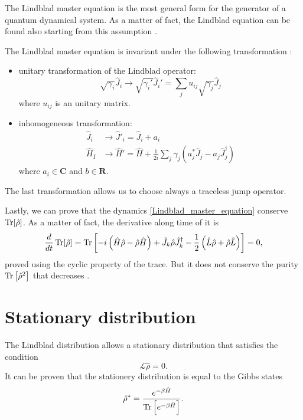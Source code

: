 The Lindblad master equation is the most general form for the generator of a quantum dynamical system. As a matter of fact, the Lindblad equation can be found also starting from this assumption \cite{Breuer-Petruccione}.

The Lindblad master equation is invariant under the following transformation \cite{Breuer-Petruccione}:
\begin{itemize}
    \item unitary transformation of the Lindblad operator:
        \begin{equation}
            \sqrt{\gamma_i}\hat J_i \rightarrow \sqrt{\gamma_i'}\hat J_i' = \sum_j u_{ij}\sqrt{\gamma_j}\hat J_j
        \end{equation}
        where $u_{ij}$ is an unitary matrix.
    \item inhomogeneous transformation:
        \begin{equation}
            \begin{split}
                \hat J_i &\rightarrow \hat J'_i = \hat J_i + a_i\\
                \hat H_I &\rightarrow \hat H' = \hat H + \frac{1}{2i}\sum_j\gamma_j\left(a^*_j\hat J_j -a_j\hat J_j^\dagger\right)
            \end{split}
        \end{equation}
        where $a_i \in\mathbf{C}$ and $b \in \mathbf{R}$.
\end{itemize}
The last transformation allows us to choose always a traceless jump operator.

Lastly, we can prove that the dynamics \eqref{Lindblad_master_equation} conserve $\operatorname{Tr}[\hat\rho]$. As a matter of fact, the derivative along time of it is
\begin{equation}\label{Lindblad_master_equation}
    \frac{d}{dt}\operatorname{Tr}[\hat\rho] = \operatorname{Tr}\left[-i\left(\hat H\hat\rho - \hat\rho\hat H \right) +  \hat J_k \hat\rho \hat J_k^\dagger -\frac{1}{2} \left(\hat L\hat\rho + \hat\rho\hat L\right)\right] = 0,
\end{equation}
proved using the cyclic property of the trace. But it does not conserve the purity $\operatorname{Tr}\left[\hat\rho^2\right]$ that decreases \cite{Manzano}. 


\section{Stationary distribution}
The Lindblad distribution allows a stationary distribution that satisfies the condition
\begin{equation}
    \mathcal{L}\hat\rho = 0.
\end{equation}
It can be proven that the stationery distribution is equal to the Gibbs states \cite{Breuer-Petruccione}
\begin{equation}
    \hat\rho^* = \frac{e^{-\beta \hat H}}{\operatorname{Tr}\left[e^{-\beta \hat H}\right]}.
\end{equation}

